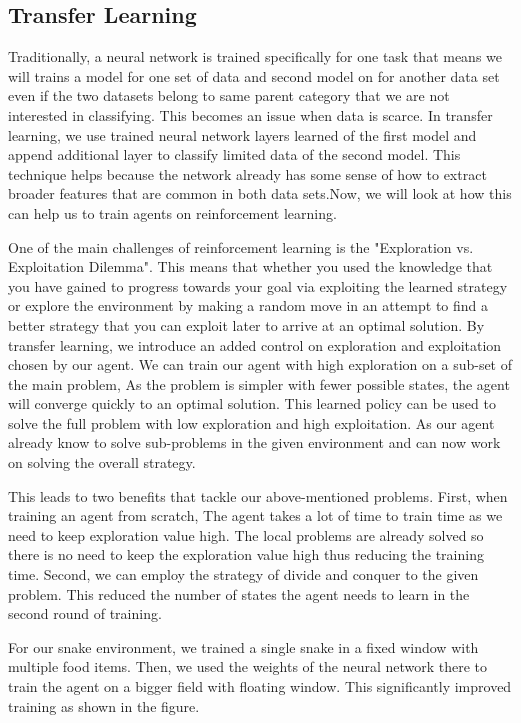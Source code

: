 \documentclass[conference,10pt]{IEEEtran}
\begin{document}
	\subsection{Transfer Learning}
	Traditionally, a neural network is trained specifically for one task that means we will trains a model for one set of data and second model on for another data set even if the two datasets belong to same parent category that we are not interested in classifying. This becomes an issue when data is scarce.  In transfer learning, we use trained neural network layers learned of the first model and append additional layer to classify limited data of the second model.  This technique helps because the network already has some sense of how to extract broader features that are common in both data sets.Now, we will look at how this can help us to train agents on reinforcement learning.


	One of the main challenges of reinforcement learning is the "Exploration vs. Exploitation Dilemma". This means that whether you used the knowledge that you have gained to progress towards your goal via exploiting the learned strategy or explore the environment by making a random move in an attempt to find a better strategy that you can exploit later to arrive at an optimal solution.  By transfer learning, we introduce an added control on exploration and exploitation chosen by our agent.
	We can train our agent with high exploration on a sub-set of the main problem, As the problem is simpler with fewer possible states, the agent will converge quickly to an optimal solution. This learned policy can be used to solve the full problem with low exploration and high exploitation. As our agent already know to solve sub-problems in the given environment and can now work on solving the overall strategy.


	This leads to two benefits that tackle our above-mentioned problems. First, when training an agent from scratch,  The agent takes a lot of time to train time as we need to keep exploration value high. The local problems are already solved so there is no need to keep the exploration value high thus reducing the training time. Second, we can employ the strategy of divide and conquer to the given problem. This reduced the number of states the agent needs to learn in the second round of training.

	For our snake environment, we trained a single snake in a fixed window with multiple food items. Then, we used the weights of the neural network there to train the agent on a bigger field with floating window. This significantly improved training as shown in the figure.
\end{document}
